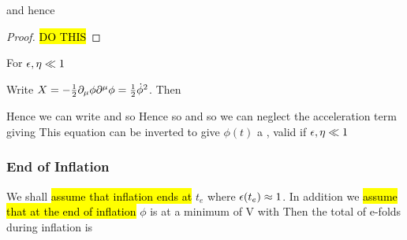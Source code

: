\documentclass{article}
\begin{document}
\begin{prop}
and hence 
\end{prop}
\begin{proof}
\hl{DO THIS}
\end{proof}

\begin{corollary}
For $\epsilon,\eta \ll 1$
\end{corollary}

\begin{definition}
Write $X = -\frac{1}{2} \partial_\mu \phi \partial^\mu \phi = \frac{1}{2}\dot{\phi}^2$. Then 
\end{definition}

Hence we can write 
and so  
Hence 
so 
and so we can neglect the acceleration term giving 
This equation can be inverted to give $\phi(t)$ a , valid if $\epsilon,\eta \ll 1$

\subsubsection*{End of Inflation}
We shall \hl{assume that inflation ends at} $t_e$ where $\epsilon(t_e)\approx 1$. In addition we \hl{assume that at the end of inflation} $\phi$ is at a minimum of V with 
Then the total of e-folds during inflation is 
\end{document}
